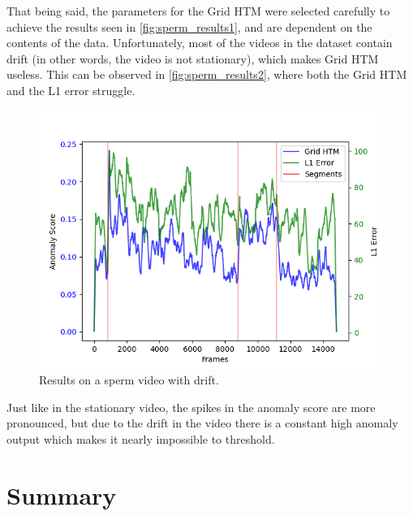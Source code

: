 \par
That being said, the parameters for the Grid HTM were selected carefully to achieve the results seen in \autoref{fig:sperm_results1}, and are dependent on the contents of the data. Unfortunately, most of the videos in the dataset contain drift (in other words, the video is not stationary), which makes Grid HTM useless. This can be observed in \autoref{fig:sperm_results2}, where both the Grid HTM and the L1 error struggle.
\begin{figure}[H]
    \centering
    \includegraphics[width=\textwidth]{resources/experiments/sperm/sperm_result2.png}
    \caption{Results on a sperm video with drift.}
    \label{fig:sperm_results2}
\end{figure}
Just like in the stationary video, the spikes in the anomaly score are more pronounced, but due to the drift in the video there is a constant high anomaly output which makes it nearly impossible to threshold.
\section{Summary}
